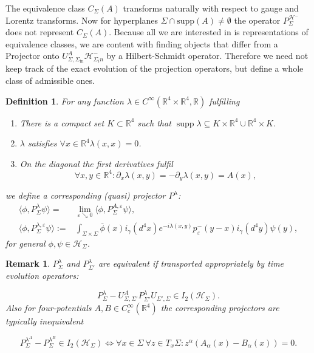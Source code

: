 \documentclass[a4paper,11pt]{article}
\newtheorem{de}{Definition}
\newtheorem{rmk}{Remark}
\newcommand{\supp}{\operatorname{supp}}
\begin{document}
The equivalence class \(C_\Sigma(A)\) transforms naturally with respect to gauge and Lorentz transforms\cite{ivp2}. 
Now for hyperplanes \(\Sigma\cap \text{supp}(A)\neq \emptyset\) the operator \(P^{\mathcal{H}^-}_{\Sigma} \) does not represent
\(C_\Sigma(A)\). Because all we are interested in is representations of equivalence classes, we are content with finding
objects that differ from a Projector onto \(U_{\Sigma,\Sigma_{\text{in}}}^A \mathcal{H}_{\Sigma_in}^-\) by a Hilbert-Schmidt operator.
Therefore we need not keep track of the exact evolution of the projection operators, but define a whole class of admissible ones.

\begin{de}
For any function \(\lambda\in C^\infty (\mathbb{R}^4\times \mathbb{R}^4, \mathbb{R})\) fulfilling
\begin{enumerate}[label= \roman*) ]
\item There is a compact set \(K\subset \mathbb{R}^4\) such that \(\supp \lambda \subseteq K\times \mathbb{R}^4 \cup \mathbb{R}^4 \times K\).
\item \(\lambda\) satisfies \(\forall x \in \mathbb{R}^4 \lambda(x,x)=0\).
\item On the diagonal the first derivatives fulfil 
\begin{equation}
\forall x,y\in\mathbb{R}^4: \partial_x \lambda(x,y)=-\partial_y \lambda(x,y) = A(x),
\end{equation}
\end{enumerate}
we define a corresponding (quasi) projector \(P^\lambda\):
\begin{align}
\langle \phi, P^\lambda_\Sigma \psi\rangle =& \lim_{\varepsilon \searrow 0} \langle \phi, P^{A,\varepsilon}_\Sigma \psi\rangle ,\\
\langle \phi, P^{\lambda,\varepsilon}_\Sigma \psi\rangle :=&
\int_{\Sigma\times\Sigma}\overline{\phi}(x)i_\gamma(d^4x) 
e^{-i \lambda(x,y)} p^-_\varepsilon(y-x)i_\gamma(d^4y) \psi(y),
\end{align}
for general \(\phi, \psi \in \mathcal{H}_\Sigma\).
\end{de}

\begin{rmk}\label{main results of ivp2}
\(P_{\Sigma}^\lambda\) and \( P_{\Sigma'}^\lambda\) are equivalent if transported appropriately by time evolution operators\cite[theorem 2.8]{ivp2}:

\begin{equation}
P_{\Sigma}^\lambda-U_{\Sigma,\Sigma'}^A P_{\Sigma'}^\lambda U_{\Sigma',\Sigma}\in I_2(\mathcal{H}_\Sigma).
\end{equation}
Also for four-potentials \(A,B\in C_c^\infty(\mathbb{R}^4)\) 
the corresponding projectors are typically inequivalent\cite[theorem 1.5]{ivp2}

\begin{equation}
P_{\Sigma}^{\lambda^A} - P_{\Sigma}^{\lambda^B} \in I_2(\mathcal{H}_\Sigma) \iff \forall x\in \Sigma~ \forall z\in T_x \Sigma: z^\alpha(A_\alpha(x)-B_\alpha(x))=0.
\end{equation}
\end{rmk}
\end{document}
